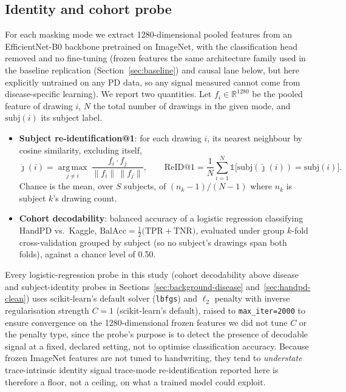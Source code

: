 \documentclass[3p,final,10pt]{elsarticle}
\let\oldsubsection\subsection
\renewcommand{\subsection}{\FloatBarrier\oldsubsection}
\begin{document}
\subsection{Identity and cohort probe}
\label{sec:probe}
For each masking mode we extract 1280-dimensional pooled features from an
EfficientNet-B0 backbone pretrained on ImageNet, with the classification
head removed and no fine-tuning (frozen features the same architecture
family used in the baseline replication (Section~\ref{sec:baseline}) and
causal lane below, but here explicitly untrained on any PD data, so any
signal measured cannot come from disease-specific learning).
We report two quantities. Let $f_i\in\mathbb{R}^{1280}$ be the pooled
feature of drawing $i$, $N$ the total number of drawings in the given mode,
and $\mathrm{subj}(i)$ its subject label.
\begin{itemize}
  \item \textbf{Subject re-identification@1}: for each drawing $i$, its
        nearest neighbour by cosine similarity, excluding itself,
        \begin{equation}
        \hat\jmath(i)=\operatorname*{arg\,max}_{j\neq i}\ \frac{f_i\cdot f_j}{\lVert f_i\rVert\,\lVert f_j\rVert},
        \qquad
        \mathrm{ReID@1}=\frac{1}{N}\sum_{i=1}^{N}\mathbb{1}\bigl[\mathrm{subj}(\hat\jmath(i))=\mathrm{subj}(i)\bigr].
        \label{eq:reid}
        \end{equation}
        Chance is the mean, over $S$ subjects, of $(n_k-1)/(N-1)$ where
        $n_k$ is subject $k$'s drawing count.
  \item \textbf{Cohort decodability}: balanced accuracy of a logistic
        regression classifying HandPD vs.\ Kaggle,
        $\mathrm{BalAcc}=\tfrac{1}{2}\bigl(\mathrm{TPR}+\mathrm{TNR}\bigr)$,
        evaluated under
        group $k$-fold cross-validation grouped by subject (so no subject's
        drawings span both folds), against a chance level of 0.50.
\end{itemize}
Every logistic-regression probe in this study (cohort decodability above
disease and subject-identity probes in
Sections~\ref{sec:background-disease} and~\ref{sec:handpd-clean}) uses
scikit-learn's default solver (\texttt{lbfgs}) and $\ell_2$ penalty with
inverse regularisation strength $C=1$ (scikit-learn's default), raised to
\texttt{max\_iter=2000} to ensure convergence on the 1280-dimensional
frozen features we did not tune $C$ or the penalty type, since the probe's
purpose is to detect the presence of decodable signal at a fixed, declared
setting, not to optimise classification accuracy.
Because frozen ImageNet features are not tuned to handwriting, they tend to
\emph{understate} trace-intrinsic identity signal trace-mode
re-identification reported here is therefore a floor, not a ceiling, on
what a trained model could exploit.
\end{document}
